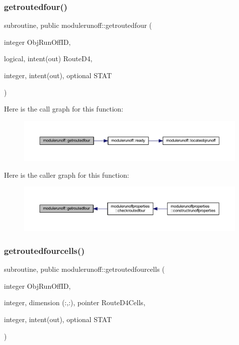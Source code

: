 \subsubsection{\texorpdfstring{getroutedfour()}{getroutedfour()}}
{\footnotesize\ttfamily subroutine, public modulerunoff\+::getroutedfour (\begin{DoxyParamCaption}\item[{integer}]{Obj\+Run\+Off\+ID,  }\item[{logical, intent(out)}]{Route\+D4,  }\item[{integer, intent(out), optional}]{S\+T\+AT }\end{DoxyParamCaption})}

Here is the call graph for this function\+:\nopagebreak
\begin{figure}[H]
\begin{center}
\leavevmode
\includegraphics[width=350pt]{namespacemodulerunoff_a092094d64e7a0ff361f536ab75f67317_cgraph}
\end{center}
\end{figure}
Here is the caller graph for this function\+:\nopagebreak
\begin{figure}[H]
\begin{center}
\leavevmode
\includegraphics[width=350pt]{namespacemodulerunoff_a092094d64e7a0ff361f536ab75f67317_icgraph}
\end{center}
\end{figure}
\mbox{\label{namespacemodulerunoff_ad1eea51d0c7cb95a4e235e18dad99861}} 
\subsubsection{\texorpdfstring{getroutedfourcells()}{getroutedfourcells()}}
{\footnotesize\ttfamily subroutine, public modulerunoff\+::getroutedfourcells (\begin{DoxyParamCaption}\item[{integer}]{Obj\+Run\+Off\+ID,  }\item[{integer, dimension (\+:,\+:), pointer}]{Route\+D4\+Cells,  }\item[{integer, intent(out), optional}]{S\+T\+AT }\end{DoxyParamCaption})}

